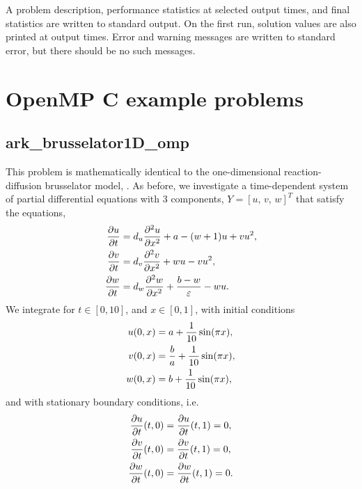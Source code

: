 \documentclass[letterpaper,10pt,english]{sphinxmanual}
\begin{document}
A problem description, performance statistics at selected output
times, and final statistics are written to standard output.  On the
first run, solution values are also printed at output times.  Error
and warning messages are written to standard error, but there should
be no such messages.


\chapter{OpenMP C example problems}
\label{c_openmp:openmp-c}\label{c_openmp::doc}\label{c_openmp:openmp-c-example-problems}

\section{ark\_brusselator1D\_omp}
\label{c_openmp:ark-brusselator1d-omp}\label{c_openmp:id1}
This problem is mathematically identical to the one-dimensional
reaction-diffusion brusselator model, {\hyperref[c_serial:ark-brusselator1d]{\emph{}}}.  As
before, we investigate a time-dependent system of partial differential
equations with 3 components, \(Y = [u,\, v,\, w]^T\) that satisfy
the equations,
\begin{gather}
\begin{split}\frac{\partial u}{\partial t} &= d_u \frac{\partial^2 u}{\partial
   x^2} + a - (w+1) u + v u^2, \\
\frac{\partial v}{\partial t} &= d_v \frac{\partial^2 v}{\partial
   x^2} + w u - v u^2, \\
\frac{\partial w}{\partial t} &= d_w \frac{\partial^2 w}{\partial
   x^2} + \frac{b-w}{\varepsilon} - w u.\end{split}\notag
\end{gather}
We integrate for \(t \in [0, 10]\), and \(x \in [0, 1]\), with
initial conditions
\begin{gather}
\begin{split}u(0,x) &=  a + \frac{1}{10} \sin(\pi x),\\
v(0,x) &= \frac{b}{a} + \frac{1}{10}\sin(\pi x),\\
w(0,x) &=  b + \frac{1}{10}\sin(\pi x),\end{split}\notag
\end{gather}
and with stationary boundary conditions, i.e.
\begin{gather}
\begin{split}\frac{\partial u}{\partial t}(t,0) &= \frac{\partial u}{\partial t}(t,1) = 0,\\
\frac{\partial v}{\partial t}(t,0) &= \frac{\partial v}{\partial t}(t,1) = 0,\\
\frac{\partial w}{\partial t}(t,0) &= \frac{\partial w}{\partial t}(t,1) = 0.\end{split}\notag
\end{gather}
\end{document}
